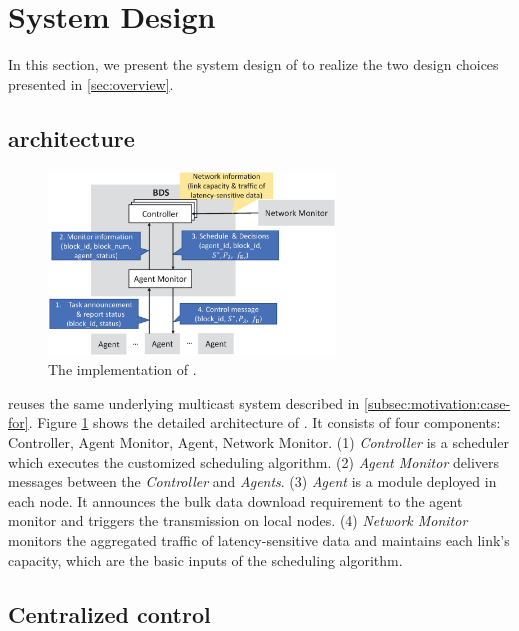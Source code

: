 \section{System Design}
\label{sec:system}

In this section, we present the system design of \name to realize the two design choices presented in \Section\ref{sec:overview}.

\subsection{\name architecture}
\label{subsec:system:architecture}

\begin{figure}[t]
  \centering
  \includegraphics[width=3in]{images/implementation_v2.eps}
  \caption{The implementation of \name.}
  \label{fig:implementation}
\end{figure}

\name reuses the same underlying multicast system described in \Section\ref{subsec:motivation:case-for}. Figure \ref{fig:implementation} shows the detailed architecture of \name. It consists of four components: Controller, Agent Monitor, Agent, Network Monitor. (1) \emph{Controller} is a scheduler which executes the customized scheduling algorithm. (2) \emph{Agent Monitor} delivers messages between the \emph{Controller} and \emph{Agents}. (3) \emph{Agent} is a module deployed in each node. It announces the bulk data download requirement to the agent monitor and triggers the transmission on local nodes. (4) \emph{Network Monitor} monitors the aggregated traffic of latency-sensitive data and maintains each link's capacity, which are the basic inputs of the scheduling algorithm.

\subsection{Centralized control}
\label{subsec:system:centralized}

